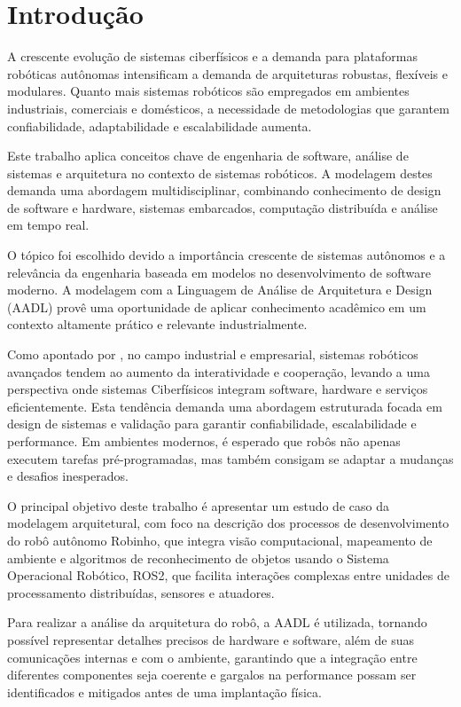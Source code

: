 \chapter{Introdução}
A crescente evolução de sistemas ciberfísicos e a demanda para plataformas robóticas autônomas intensificam a demanda de arquiteturas robustas, flexíveis e modulares. Quanto mais sistemas robóticos são empregados em ambientes industriais, comerciais e domésticos, a necessidade de metodologias que garantem confiabilidade, adaptabilidade e escalabilidade aumenta.

Este trabalho aplica conceitos chave de engenharia de software, análise de sistemas e arquitetura no contexto de sistemas robóticos. A modelagem destes demanda uma abordagem multidisciplinar, combinando conhecimento de design de software e hardware, sistemas embarcados, computação distribuída e análise em tempo real.

O tópico foi escolhido devido a importância crescente de sistemas autônomos e a relevância da engenharia baseada em modelos no desenvolvimento de software moderno. A modelagem com a Linguagem de Análise de Arquitetura e Design (AADL) provê uma oportunidade de aplicar conhecimento acadêmico em um contexto altamente prático e relevante industrialmente.

Como apontado por \cite{Mikusz2014}, no campo industrial e empresarial, sistemas robóticos avançados tendem ao aumento da interatividade e cooperação, levando a uma perspectiva onde sistemas Ciberfísicos integram software, hardware e serviços eficientemente. Esta tendência demanda uma abordagem estruturada focada em design de sistemas e validação para garantir confiabilidade, escalabilidade e performance. Em ambientes modernos, é esperado que robôs não apenas executem tarefas pré-programadas, mas também consigam se adaptar a mudanças e desafios inesperados.

O principal objetivo deste trabalho é apresentar um estudo de caso da modelagem arquitetural, com foco na descrição dos processos de desenvolvimento do robô autônomo Robinho, que integra visão computacional, mapeamento de ambiente e algoritmos de reconhecimento de objetos usando o Sistema Operacional Robótico, ROS2, que facilita interações complexas entre unidades de processamento distribuídas, sensores e atuadores.

Para realizar a análise da arquitetura do robô, a AADL é utilizada, tornando possível representar detalhes precisos de hardware e software, além de suas comunicações internas e com o ambiente, garantindo que a integração entre diferentes componentes seja coerente e gargalos na performance possam ser identificados e mitigados antes de uma implantação física.

